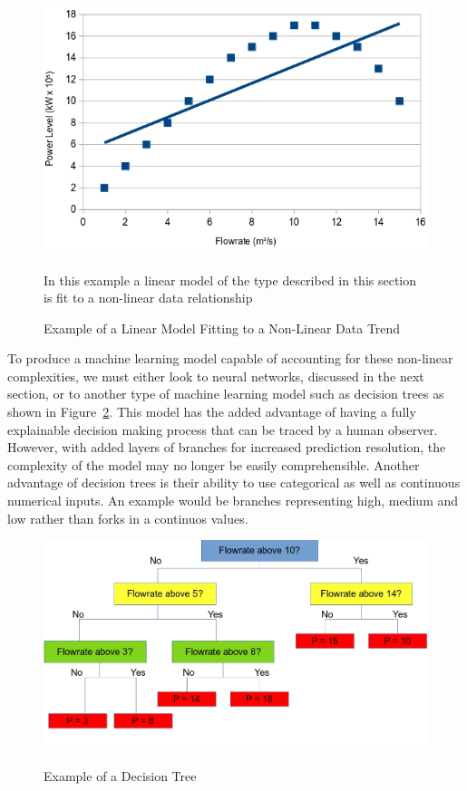 
\begin{figure}[h]
	\centering
	\includegraphics[scale=0.45]{Figures/LinearFit.jpg}
	\caption{Example of a Linear Model Fitting to a Non-Linear Data Trend} {In this example a linear model of the type described in this section is fit to a non-linear data relationship}
	\label{fig:linearFit}
\end{figure}

 
 \noindent
 To produce a machine learning model capable of accounting for these non-linear complexities, we must either look to neural networks, discussed in the next section, or to another type of machine learning model such as decision trees \cite{de2013decision} as shown in Figure~\ref{fig:DecisionTree}. This model has the added advantage of having a fully explainable decision making process that can be traced by a human observer. However, with added layers of branches for increased prediction resolution, the complexity of the model may no longer be easily comprehensible. Another advantage of decision trees is their ability to use categorical as well as continuous numerical inputs. An example would be branches representing high, medium and low rather than forks in a continuos values.
 
 \begin{figure}[h]
 	\centering
 	\includegraphics[scale=0.4]{Figures/DecisionTree.jpg}
 	\caption{Example of a Decision Tree} {}
 	\label{fig:DecisionTree}
 \end{figure}


